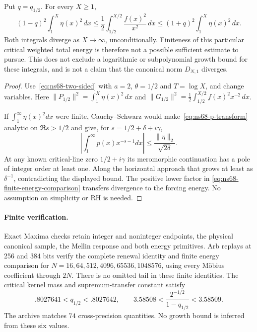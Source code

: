 \begin{corollary}
\label{cor:ns68-critical-energy}
Put $q=q_{1/2}$. For every $X\geq1$,
\begin{equation}
 (1-q)^2\int_1^X\eta(x)^2\,dx
 \leq\frac12\int_{1/2}^{X/2}\frac{f(x)^2}{x^2}\,dx
 \leq(1+q)^2\int_1^X\eta(x)^2\,dx.
 \label{eq:ns68-finite-energy-comparison}
\end{equation}
Both integrals diverge as $X\to\infty$, unconditionally. Finiteness
of this particular critical weighted total energy is therefore not a
possible sufficient estimate to pursue. This does not exclude a
logarithmic or subpolynomial growth bound for these integrals, and is
not a claim that the canonical norm $D_{N,1}$ diverges.
\end{corollary}
\begin{proof}
Use~\eqref{eq:ns68-two-sided} with $a=2$, $\theta=1/2$ and
$T=\log X$, and change variables. Here
$\|P_{1/2}\|^2=\int_1^X\eta(x)^2\,dx$ and
$\|G_{1/2}\|^2=\tfrac12\int_{1/2}^{X/2}f(x)^2x^{-2}\,dx$.

If $\int_1^\infty\eta(x)^2dx$ were finite, Cauchy--Schwarz would
make~\eqref{eq:ns68-p-transform} analytic on $\Re s>1/2$ and give,
for $s=1/2+\delta+i\gamma$,
\[
 \left|\int_1^\infty p(x)x^{-s-1}dx\right|
       \leq\frac{\|\eta\|_2}{\sqrt{2\delta}}.
\]
At any known critical-line zero $1/2+i\gamma$ its meromorphic
continuation has a pole of integer order at least one. Along the
horizontal approach that grows at least as $\delta^{-1}$, contradicting
the displayed bound. The positive lower factor in
\eqref{eq:ns68-finite-energy-comparison} transfers divergence to the
forcing energy. No assumption on simplicity or RH is needed.
\end{proof}

\paragraph{Finite verification.}
Exact Maxima checks retain integer and noninteger endpoints, the physical
canonical sample, the Mellin response and both energy primitives.
Arb replays at 256 and 384 bits verify the complete renewal identity
and finite energy comparison for
$N=16,64,512,4096,65536,1048576$, using every M\"obius coefficient
through $2N$. There is no omitted tail in these finite identities.
The critical kernel mass and supremum-transfer constant satisfy
\[
 .8027641<q_{1/2}<.8027642,\qquad
 3.58508<\frac{2^{-1/2}}{1-q_{1/2}}<3.58509.
\]
The archive matches $74$ cross-precision quantities. No growth bound
is inferred from these six values.

